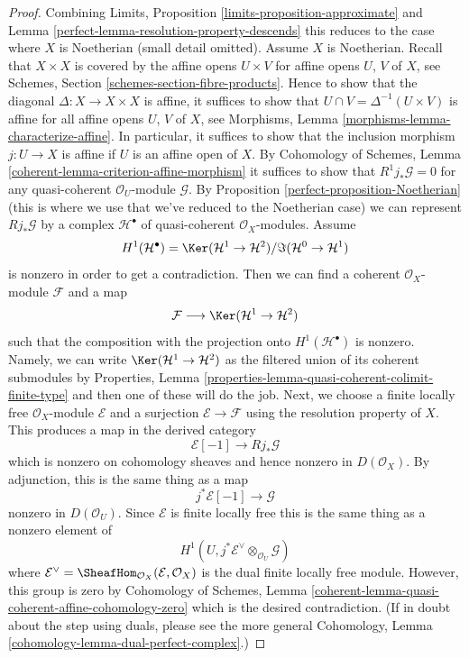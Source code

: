 \begin{proof}

Combining Limits, Proposition \ref{limits-proposition-approximate}
and Lemma \ref{perfect-lemma-resolution-property-descends}
this reduces to the case where $X$ is Noetherian (small detail omitted).
Assume $X$ is Noetherian.
Recall that $X \times X$ is covered by the affine opens
$U \times V$ for affine opens $U$, $V$ of $X$, see
Schemes, Section \ref{schemes-section-fibre-products}.
Hence to show that the diagonal $\Delta : X \to X \times X$
is affine, it suffices to show that $U \cap V = \Delta^{-1}(U \times V)$
is affine for all affine opens $U$, $V$ of $X$, see
Morphisms, Lemma \ref{morphisms-lemma-characterize-affine}.
In particular, it suffices to show that the inclusion morphism
$j : U \to X$ is affine if $U$ is an affine open of $X$.
By Cohomology of Schemes, Lemma \ref{coherent-lemma-criterion-affine-morphism}
it suffices to show that $R^1j_*\mathcal{G} = 0$ for any
quasi-coherent $\mathcal{O}_U$-module $\mathcal{G}$.
By Proposition \ref{perfect-proposition-Noetherian} (this is where we use
that we've reduced to the Noetherian case)
we can represent $Rj_*\mathcal{G}$ by a complex
$\mathcal{H}^\bullet$ of quasi-coherent $\mathcal{O}_X$-modules.
Assume
$$
H^1(\mathcal{H}^\bullet) =
\Ker(\mathcal{H}^1 \to \mathcal{H}^2)/\Im(\mathcal{H}^0 \to \mathcal{H}^1)
$$
is nonzero in order to get a contradiction. Then we can find a coherent
$\mathcal{O}_X$-module $\mathcal{F}$ and a map
$$
\mathcal{F} \longrightarrow
\Ker(\mathcal{H}^1 \to \mathcal{H}^2)
$$
such that the composition with the projection onto $H^1(\mathcal{H}^\bullet)$
is nonzero. Namely, we can write $\Ker(\mathcal{H}^1 \to \mathcal{H}^2)$
as the filtered union of its coherent submodules by
Properties, Lemma \ref{properties-lemma-quasi-coherent-colimit-finite-type}
and then one of these will do the job.
Next, we choose a finite locally free $\mathcal{O}_X$-module
$\mathcal{E}$ and a surjection $\mathcal{E} \to \mathcal{F}$ using
the resolution property of $X$.
This produces a map in the derived category
$$
\mathcal{E}[-1] \longrightarrow Rj_*\mathcal{G}
$$
which is nonzero on cohomology sheaves and hence nonzero in $D(\mathcal{O}_X)$.
By adjunction, this is the same thing as a map
$$
j^*\mathcal{E}[-1] \to \mathcal{G}
$$
nonzero in $D(\mathcal{O}_U)$. Since $\mathcal{E}$ is finite locally
free this is the same thing as a nonzero element of
$$
H^1(U, j^*\mathcal{E}^\vee \otimes_{\mathcal{O}_U} \mathcal{G})
$$
where
$\mathcal{E}^\vee = \SheafHom_{\mathcal{O}_X}(\mathcal{E}, \mathcal{O}_X)$
is the dual finite locally free module. However, this group is zero by
Cohomology of Schemes, Lemma
\ref{coherent-lemma-quasi-coherent-affine-cohomology-zero}
which is the desired contradiction.
(If in doubt about the step using duals, please see the more general
Cohomology, Lemma \ref{cohomology-lemma-dual-perfect-complex}.)
\end{proof}

